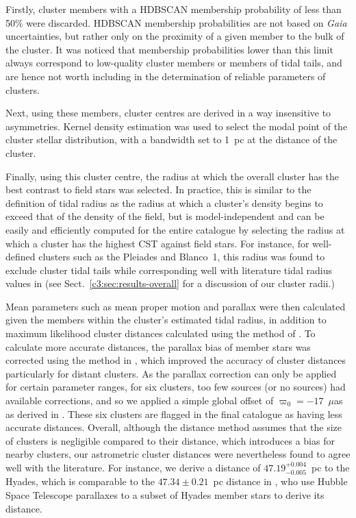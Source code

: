 Firstly, cluster members with a HDBSCAN membership probability of less than 50\% were discarded. HDBSCAN membership probabilities are not based on \emph{Gaia} uncertainties, but rather only on the proximity of a given member to the bulk of the cluster. It was noticed that membership probabilities lower than this limit always correspond to low-quality cluster members or members of tidal tails, and are hence not worth including in the determination of reliable parameters of clusters. 

Next, using these members, cluster centres are derived in a way insensitive to asymmetries. Kernel density estimation was used to select the modal point of the cluster stellar distribution, with a bandwidth set to 1~pc at the distance of the cluster. 

Finally, using this cluster centre, the radius at which the overall cluster has the best contrast to field stars was selected. In practice, this is similar to the \cite{king_structure_1962} definition of tidal radius as the radius at which a cluster's density begins to exceed that of the density of the field, but is model-independent and can be easily and efficiently computed for the entire catalogue by selecting the radius at which a cluster has the highest CST against field stars. For instance, for well-defined clusters such as the Pleiades and Blanco~1, this radius was found to exclude cluster tidal tails while corresponding well with literature tidal radius values in \cite{kharchenko_global_2013} (see Sect.~\ref{c3:sec:results-overall} for a discussion of our cluster radii.)

Mean parameters such as mean proper motion and parallax were then calculated given the members within the cluster's estimated tidal radius, in addition to maximum likelihood cluster distances calculated using the method of \cite{cantat-gaudin_characterising_2018}. To calculate more accurate distances, the parallax bias of member stars was corrected using the method in \cite{lindegren_gaia_2021}, which improved the accuracy of cluster distances particularly for distant clusters. As the \cite{lindegren_gaia_2021} parallax correction can only be applied for certain parameter ranges, for six clusters, too few sources (or no sources) had available corrections, and so we applied a simple global offset of $\varpi_0 = -17$~$\mu$as as derived in \cite{lindegren_gaia_2021}. These six clusters are flagged in the final catalogue as having less accurate distances. Overall, although the \cite{cantat-gaudin_characterising_2018} distance method assumes that the size of clusters is negligible compared to their distance, which introduces a bias for nearby clusters, our astrometric cluster distances were nevertheless found to agree well with the literature. For instance, we derive a distance of $47.19^{+0.004}_{-0.005}$~pc to the Hyades, which is comparable to the $47.34\pm0.21$~pc distance in \cite{mcarthur_astrometry_2011}, who use Hubble Space Telescope parallaxes to a subset of Hyades member stars to derive its distance.


